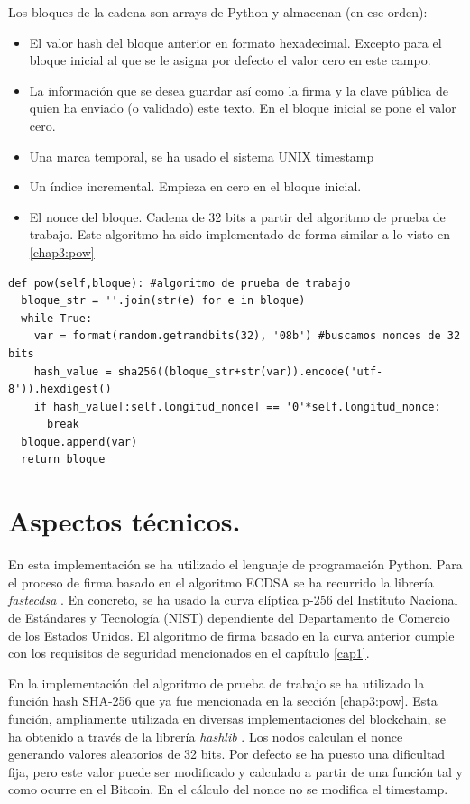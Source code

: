 Los bloques de la cadena son arrays de Python y almacenan (en ese orden):
\begin{itemize}
\item El valor hash del bloque anterior en formato hexadecimal. Excepto para el bloque inicial al que se le asigna por defecto el valor cero en este campo.
\item La información que se desea guardar así como la firma y la clave pública de quien ha enviado (o validado) este texto. En el bloque inicial se pone el valor cero.
\item Una marca temporal, se ha usado el sistema UNIX timestamp
\item Un índice incremental. Empieza en cero en el bloque inicial.  
\item El nonce del bloque. Cadena de 32 bits a partir del algoritmo de prueba de trabajo. Este algoritmo ha sido implementado de forma similar a lo visto en \ref{chap3:pow}
\end{itemize}

\lstset{language=Python}
\lstset{frame=lines}
\lstset{basicstyle=\footnotesize}
\begin{lstlisting}[frame=single]
def pow(self,bloque): #algoritmo de prueba de trabajo
  bloque_str = ''.join(str(e) for e in bloque)
  while True:
    var = format(random.getrandbits(32), '08b') #buscamos nonces de 32 bits
    hash_value = sha256((bloque_str+str(var)).encode('utf-8')).hexdigest()
    if hash_value[:self.longitud_nonce] == '0'*self.longitud_nonce:
      break
  bloque.append(var)
  return bloque
\end{lstlisting}


\section{Aspectos técnicos.}
En esta implementación se ha utilizado el lenguaje de programación Python. Para el proceso de firma basado en el algoritmo ECDSA se ha recurrido la librería \textit{fastecdsa} \citep{fastecdsa}. En concreto, se ha usado la curva elíptica p-256 del Instituto Nacional de Estándares y Tecnología (NIST) dependiente del Departamento de Comercio de los Estados Unidos. El algoritmo de firma basado en la curva anterior cumple con los requisitos de seguridad mencionados en el capítulo \ref{cap1}.

En la implementación del algoritmo de prueba de trabajo se ha utilizado la función hash SHA-256 que ya fue mencionada en la sección \ref{chap3:pow}. Esta función, ampliamente utilizada en diversas implementaciones del blockchain, se ha obtenido a través de la librería \textit{hashlib} \citep{hashlib}. Los nodos calculan el nonce generando valores aleatorios de 32 bits. Por defecto se ha puesto una dificultad fija, pero este valor puede ser modificado y calculado a partir de una función tal y como ocurre en el Bitcoin. En el cálculo del nonce no se modifica el timestamp.


